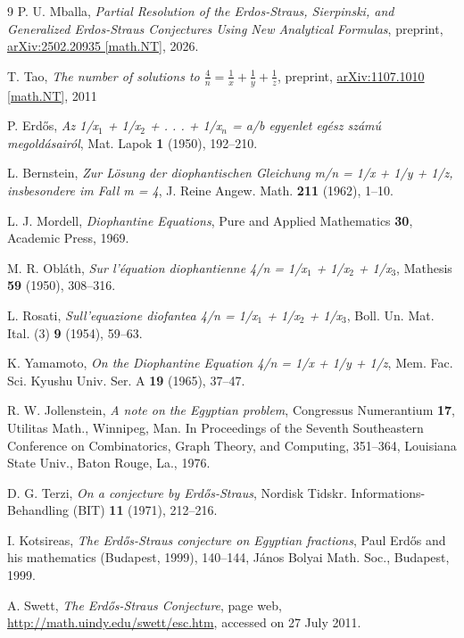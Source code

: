 \documentclass[12pt]{article}
\begin{document}
\begin{thebibliography}{9}
P. U. Mballa, \textit{Partial Resolution of the Erdos-Straus, Sierpinski, and Generalized Erdos-Straus Conjectures Using New Analytical Formulas}, preprint, \href{https://arxiv.org/abs/2502.20935}{arXiv:2502.20935 [math.NT]}, 2026.

 T. Tao, \textit{The number of solutions to \(\frac{4}{n}=\frac{1}{x}+\frac{1}{y}+\frac{1}{z}\)}, preprint, \href{https://arxiv.org/abs/1107.1010}{arXiv:1107.1010 [math.NT]}, 2011

P. Erdős, \textit{Az 1/x$_1$ + 1/x$_2$ + . . . + 1/x$_n$ = a/b egyenlet egész számú megoldásairól}, Mat. Lapok \textbf{1} (1950), 192–210.

L. Bernstein, \textit{Zur Lösung der diophantischen Gleichung m/n = 1/x + 1/y + 1/z, insbesondere im Fall m = 4}, J. Reine Angew. Math. \textbf{211} (1962), 1–10.

L. J. Mordell, \textit{Diophantine Equations}, Pure and Applied Mathematics \textbf{30}, Academic Press, 1969.

M. R. Obláth, \textit{Sur l'équation diophantienne 4/n = 1/x$_1$ + 1/x$_2$ + 1/x$_3$}, Mathesis \textbf{59} (1950), 308–316.

L. Rosati, \textit{Sull'equazione diofantea 4/n = 1/x$_1$ + 1/x$_2$ + 1/x$_3$}, Boll. Un. Mat. Ital. (3) \textbf{9} (1954), 59–63.

K. Yamamoto, \textit{On the Diophantine Equation 4/n = 1/x + 1/y + 1/z}, Mem. Fac. Sci. Kyushu Univ. Ser. A \textbf{19} (1965), 37–47.

R. W. Jollenstein, \textit{A note on the Egyptian problem}, Congressus Numerantium \textbf{17}, Utilitas Math., Winnipeg, Man. In Proceedings of the Seventh Southeastern Conference on Combinatorics, Graph Theory, and Computing, 351–364, Louisiana State Univ., Baton Rouge, La., 1976.

D. G. Terzi, \textit{On a conjecture by Erdős-Straus}, Nordisk Tidskr. Informations-Behandling (BIT) \textbf{11} (1971), 212–216.

I. Kotsireas, \textit{The Erdős-Straus conjecture on Egyptian fractions}, Paul Erdős and his mathematics (Budapest, 1999), 140–144, János Bolyai Math. Soc., Budapest, 1999.

A. Swett, \textit{The Erdős-Straus Conjecture}, page web, \url{http://math.uindy.edu/swett/esc.htm}, accessed on 27 July 2011.


\end{thebibliography}
\end{document}
